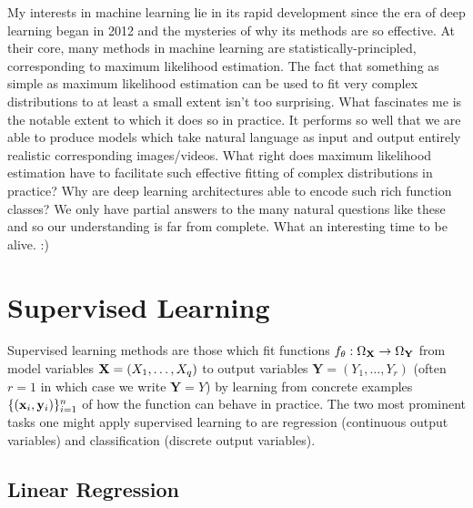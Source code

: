 \documentclass[11pt]{article}
\begin{document}
My interests in machine learning lie in its rapid development since the era of deep learning began in 2012 and the mysteries of why its methods are so effective. At their core, many methods in machine learning are statistically-principled, corresponding to maximum likelihood estimation. The fact that something as simple as maximum likelihood estimation can be used to fit very complex distributions to at least a small extent isn't too surprising. What fascinates me is the notable extent to which it does so in practice. It performs so well that we are able to produce models which take natural language as input and output entirely realistic corresponding images/videos. What right does maximum likelihood estimation have to facilitate such effective fitting of complex distributions in practice? Why are deep learning architectures able to encode such rich function classes? We only have partial answers to the many natural questions like these and so our understanding is far from complete. What an interesting time to be alive. :)

\section{Supervised Learning}
Supervised learning methods are those which fit functions $f_{\theta}:\Omega_{\mathbf{X}}\to\Omega_{\mathbf{Y}}$ from model variables $\mathbf{X}=(X_1,\dots,X_q)$ to output variables $\mathbf{Y}=(Y_1,\dots,Y_r)$ (often $r=1$ in which case we write $\mathbf{Y}=Y$) by learning from concrete examples $\{(\mathbf{x}_i,\mathbf{y}_i)\}_{i=1}^n$ of how the function can behave in practice. The two most prominent tasks one might apply supervised learning to are regression (continuous output variables) and classification (discrete output variables).

\subsection{Linear Regression}
\end{document}
